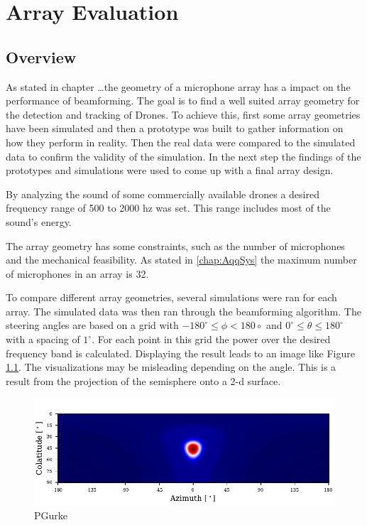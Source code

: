 \chapter{Array Evaluation}
\section{Overview}
As stated in chapter \dots the geometry of a microphone array
has a impact on the performance of beamforming.
The goal is to find a well suited array geometry for the detection and tracking of
Drones.
To achieve this, first some array geometries have been simulated and then
a prototype was built to gather information on how they perform in reality.
Then the real data were compared to the simulated data to
confirm the validity of the simulation.
In the next step the findings of the prototypes and simulations
were used to come up with a final array design.

By analyzing the sound of some commercially available drones
a desired frequency range of 500 to 2000 hz was set.
This range includes most of the sound's energy.

The array geometry has some constraints,
such as the number of microphones and the mechanical feasibility.
As stated in \ref*{chap:AqqSys} the maximum number of microphones
in an array is 32.

To compare different array geometries, several simulations
were ran for each array.
The simulated data was then ran through the beamforming
algorithm.
The steering angles are based on a grid with $-180^\circ \leq \phi < 180\circ$ and
$0^\circ \leq \theta \leq 180^\circ$ with a spacing of $1^\circ$.
For each point in this grid the power over the desired frequency band is calculated.
Displaying the result leads to an image like Figure \ref*{aev:fig:gridEx}.
The visualizations may be misleading depending on the angle.
This is a result from the projection of the semisphere onto a 2-d surface.
\begin{figure}
	\centering
	\includegraphics[]{images/5_array_evaluation/0.5_0.79.pdf}
	\caption{PGurke}
	\label{aev:fig:gridEx}
\end{figure}
